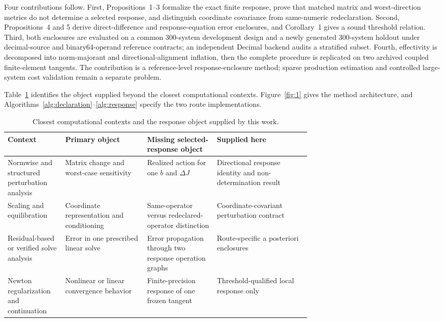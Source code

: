 \documentclass[preprint,12pt]{elsarticle}
\theoremstyle{definition}
\begin{document}
Four contributions follow. First, Propositions~1--3 formalize the exact finite response, prove that matched matrix and worst-direction metrics do not determine a selected response, and distinguish coordinate covariance from same-numeric redeclaration. Second, Propositions~4 and 5 derive direct-difference and response-equation error enclosures, and Corollary~1 gives a sound threshold relation. Third, both enclosures are evaluated on a common 300-system development design and a newly generated 300-system holdout under decimal-source and binary64-operand reference contracts; an independent Decimal backend audits a stratified subset. Fourth, effectivity is decomposed into norm-majorant and directional-alignment inflation, then the complete procedure is replicated on two archived coupled finite-element tangents. The contribution is a reference-level response-enclosure method; sparse production estimation and controlled large-system cost validation remain a separate problem.

Table~\ref{tab:closest} identifies the object supplied beyond the closest computational contexts. Figure~\ref{fig:1} gives the method architecture, and Algorithms~\ref{alg:declaration}--\ref{alg:response} specify the two route implementations.

\begin{table}[htbp]
\centering
\footnotesize
\caption{Closest computational contexts and the response object supplied by this work.}
\label{tab:closest}
\begin{tabularx}{\linewidth}{>{\RaggedRight\arraybackslash}p{0.19\linewidth} >{\RaggedRight\arraybackslash}p{0.27\linewidth} >{\RaggedRight\arraybackslash}p{0.23\linewidth} X}
\toprule
Context & Primary object & Missing selected-response object & Supplied here \\
\midrule
Normwise and structured perturbation analysis & Matrix change and worst-case sensitivity & Realized action for one $b$ and $\Delta J$ & Directional response identity and non-determination result \\
Scaling and equilibration & Coordinate representation and conditioning & Same-operator versus redeclared-operator distinction & Coordinate-covariant perturbation contract \\
Residual-based or verified solve analysis & Error in one prescribed linear solve & Error propagation through two response operation graphs & Route-specific a posteriori enclosures \\
Newton regularization and continuation & Nonlinear or linear convergence behavior & Finite-precision response of one frozen tangent & Threshold-qualified local response only \\
\bottomrule
\end{tabularx}
\end{table}
\end{document}
